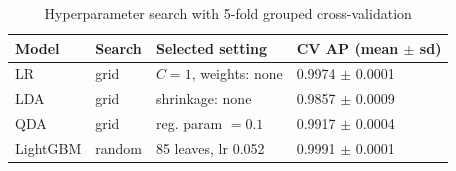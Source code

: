 \begin{table}[t]
\centering
\footnotesize
\caption{Hyperparameter search with 5-fold grouped cross-validation}
\label{tab:tuning}
\begin{tabular}{llll}
\toprule
Model & Search & Selected setting & CV AP (mean $\pm$ sd) \\
\midrule
LR & grid & $C=1$, weights: none & 0.9974 $\pm$ 0.0001 \\
LDA & grid & shrinkage: none & 0.9857 $\pm$ 0.0009 \\
QDA & grid & reg. param $=0.1$ & 0.9917 $\pm$ 0.0004 \\
LightGBM & random & 85 leaves, lr 0.052 & 0.9991 $\pm$ 0.0001 \\
\bottomrule
\end{tabular}
\end{table}
